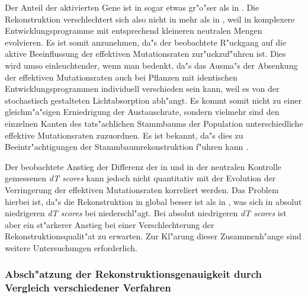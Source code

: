 \begin{sloppypar}
Der Anteil der aktivierten Gene ist in  sogar etwas gr"o"ser als in . Die
Rekonstruktion verschlechtert sich also nicht in  mehr als in , weil in
 komplexere Entwicklungsprogramme mit entsprechend kleineren neutralen Mengen evolvieren.
Es ist somit anzunehmen, da"s der beobachtete R"uckgang auf die aktive Beeinflussung der effektiven Mutationsraten
zur"uckzuf"uhren ist. Dies wird umso einleuchtender, wenn man bedenkt, da"s das Ausma"s der Absenkung der effektiven
Mutationsraten auch bei Pflanzen mit identischen Entwicklungsprogrammen individuell verschieden sein kann, weil es
von der stochastisch gestalteten Lichtabsorption abh"angt. Es kommt somit nicht zu einer gleichm"a"sigen Erniedrigung der
Austauschrate, sondern vielmehr sind den einzelnen Kanten des tats"achlichen Stammbaums der Population unterschiedliche
effektive Mutationsraten zuzuordnen. Es ist bekannt, da"s dies zu Beeintr"achtigungen der Stammbaumrekonstruktion
f"uhren kann \cite{Felsenstein88}.
\end{sloppypar}

Der beobachtete Anstieg der Differenz der in  und in der neutralen Kontrolle gemessenen \textsl{dT scores} 
kann jedoch nicht quantitativ mit der Evolution der Verringerung der effektiven Mutationsraten korreliert werden. Das Problem
hierbei ist, da"s die Rekonstruktion in  global besser ist als in , was sich in
absolut niedrigeren \textsl{dT scores} bei  niederschl"agt. Bei absolut niedrigeren \textsl{dT scores}
ist aber ein st"arkerer Anstieg bei einer Verschlechterung der Rekonstruktionsqualit"at zu erwarten. Zur Kl"arung
dieser Zusammenh"ange sind weitere Untersuchungen erforderlich.






\subsubsection{Absch"atzung der Rekonstruktionsgenauigkeit durch Vergleich verschiedener Verfahren}

